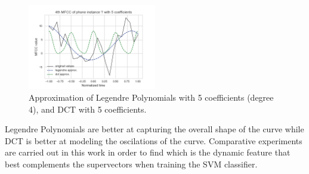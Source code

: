 \begin{figure}[H]
  \centering
  \includegraphics[width=0.5\textwidth]{files/figures/method/dynamic_features_5}
  \caption{Approximation of Legendre Polynomials with 5 coefficients (degree 4),
    and DCT with 5 coefficients.}
\end{figure}

Legendre Polynomials are better at capturing the overall shape of the curve while DCT
is better at modeling the oscilations of the curve. Comparative experiments are carried
out in this work
in order to find which is the dynamic feature that best complements the supervectors when
training the SVM classifier.

